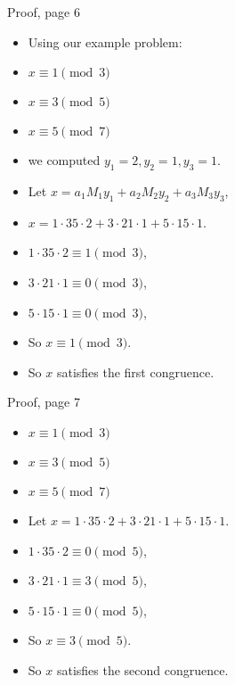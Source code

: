 \documentclass{beamer}
\begin{document}
\begin{frame}{Proof, page 6}

\begin{itemize}
  \item Using our example problem:
  \item $x \equiv 1 \pmod 3$
  \item $x \equiv 3 \pmod 5$
  \item $x \equiv 5 \pmod 7$
  \item we computed $y_1 = 2, y_2 = 1, y_3 = 1$.
  \item Let $x = a_1 M_1 y_1 + a_2 M_2 y_2 + a_3 M_3 y_3$,
  \item $x = 1 \cdot 35 \cdot 2 + 3 \cdot 21 \cdot 1 + 5 \cdot 15 \cdot 1$.
  \item $1 \cdot 35 \cdot 2 \equiv 1 \pmod 3$,
  \item $3 \cdot 21 \cdot 1 \equiv 0 \pmod 3$,
  \item $5 \cdot 15 \cdot 1 \equiv 0 \pmod 3$,
  \item So $x \equiv 1 \pmod 3$.
  \item So $x$ satisfies the first congruence.
\end{itemize}

\end{frame}

\begin{frame}{Proof, page 7}

\begin{itemize}
  \item $x \equiv 1 \pmod 3$
  \item $x \equiv 3 \pmod 5$
  \item $x \equiv 5 \pmod 7$
  \item Let $x = 1 \cdot 35 \cdot 2 + 3 \cdot 21 \cdot 1 + 5 \cdot 15 \cdot 1$.
  \item $1 \cdot 35 \cdot 2 \equiv 0 \pmod 5$,
  \item $3 \cdot 21 \cdot 1 \equiv 3 \pmod 5$,
  \item $5 \cdot 15 \cdot 1 \equiv 0 \pmod 5$,
  \item So $x \equiv 3 \pmod 5$.
  \item So $x$ satisfies the second congruence.
\end{itemize}

\end{frame}
\end{document}
